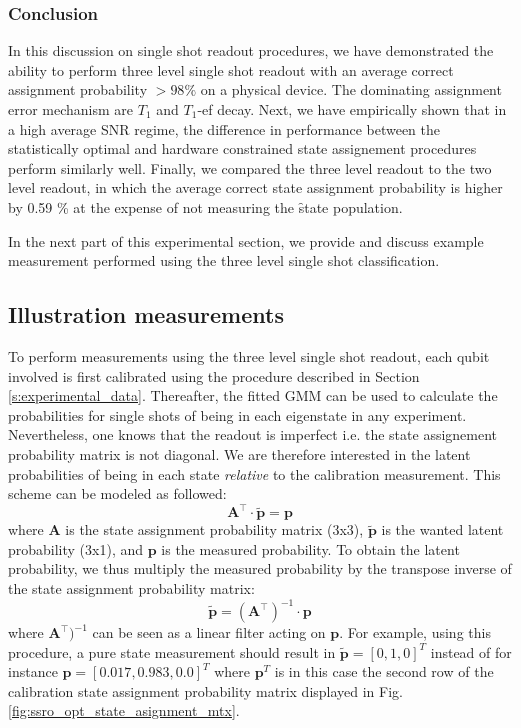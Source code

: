 \subsubsection{Conclusion}
In this discussion on single shot readout procedures, we have demonstrated the ability to perform three level single shot readout with an average correct assignment probability $> 98\%$ on a physical device. The dominating assignment error mechanism are $T_1$ and $T_1$-ef decay. Next, we have empirically shown that in a high average SNR regime, the difference in performance between the statistically optimal and hardware constrained state assignement procedures perform similarly well. Finally, we compared the three level readout to the two level readout, in which the average correct state assignment probability is higher by 0.59 \% at the expense of not measuring the \f state population. 

In the next part of this experimental section, we provide and discuss example measurement performed using the three level single shot classification. 

\subsection{Illustration measurements}
To perform measurements using the three level single shot readout, each qubit involved is first calibrated using the procedure described in Section \ref{s:experimental_data}. Thereafter, the fitted GMM can be used to calculate the probabilities for single shots of being in each eigenstate in any experiment. Nevertheless, one knows that the readout is imperfect i.e. the state assignement probability matrix is not diagonal. We are therefore interested in the latent probabilities \cite{Cai2012LatentModeling} of being in each state \textit{relative} to the calibration measurement. This scheme can be modeled as followed:
\begin{equation}
    \mathbf{A}^\intercal \cdot \mathbf{\tilde{p}} = \mathbf{p}
\end{equation}
where $\mathbf{A}$ is the state assignment probability matrix (3x3), $\mathbf{\tilde{p}}$ is the wanted latent probability (3x1), and $\mathbf{p}$ is the measured probability. To obtain the latent probability, we thus multiply the measured probability by the transpose inverse of the state assignment probability matrix:
\begin{equation} \label{eq:mtx_inversion}
     \mathbf{\tilde{p}} = (\mathbf{A}^{\intercal})^{-1} \cdot\mathbf{p}
\end{equation}
where $\mathbf{A}^{\intercal})^{-1}$ can be seen as a linear filter acting on $\mathbf{p}$. For example, using this procedure, a pure \e state measurement should result in $\mathbf{\tilde{p}} = [0,1,0]^T$ instead of for instance $\mathbf{p} = [0.017,0.983,0.0]^T$ where $\mathbf{p}^T$ is in this case the second row of the calibration state assignment probability matrix displayed in Fig. \ref{fig:ssro_opt_state_asignment_mtx}. 

